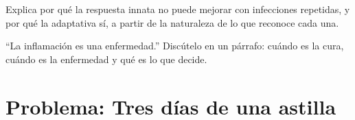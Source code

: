 \begin{exercise}[$\star\star\star$]\label{exo:g12:innate-immunity:14}
Explica por qué la respuesta innata no puede mejorar con infecciones
repetidas, y por qué la adaptativa sí, a partir de la naturaleza de lo
que reconoce cada una.
\end{exercise}

\begin{exercise}[$\star\star\star$]\label{exo:g12:innate-immunity:15}
``La inflamación es una enfermedad.'' Discútelo en un párrafo: cuándo
es la cura, cuándo es la enfermedad y qué es lo que decide.
\end{exercise}

\section{Problema: Tres días de una astilla}

